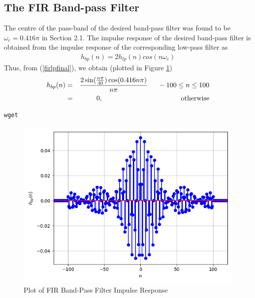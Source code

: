 \documentclass{article}
\begin{document}
\subsection{The FIR Band-pass Filter}
The centre of the pass-band of the desired band-pass filter was found to be $\omega_c = 0.416\pi$ in Section
2.1.  The impulse response of the desired band-pass filter is obtained from the impulse response of the
corresponding low-pass filter as
\begin{eqnarray}
h_{bp}(n) = 2h_{lp}(n)cos(n\omega_c)
\end{eqnarray}
Thus, from (\ref{firlpfinal}), we obtain (plotted in Figure \ref{fig:8})
\begin{eqnarray}
\label{firbpfinal}
h_{bp}(n) &=& \frac{2\sin(\frac{n\pi}{40}) \cos(0.416n\pi)}{n\pi} \indent -100 \leq n \leq 100 \nonumber \\
&=& 0, \hspace{4cm} \mbox{otherwise}
\end{eqnarray}
\begin{lstlisting}[caption = {Code for Figure 8}]
wget 
\end{lstlisting}
\begin{figure}[!h]
    \centering
    \includegraphics[width = \columnwidth]{figs/fir_hbp.png}
    \caption{Plot of FIR Band-Pass Filter Impulse Response}
    \label{fig:8}
\end{figure}
\end{document}
